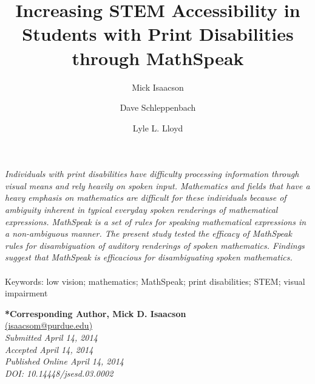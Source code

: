 \documentclass[11.5pt]{sig-alternate} %
\makeatletter
\let\oldabstract\abstract
\let\oldendabstract\endabstract
\renewenvironment{abstract} %
{\renewenvironment{quotation}%
               {\list{}{\addtolength{\leftmargin}{1em} %
                        \listparindent 1.5em%
                        \itemindent    \listparindent%
                        \rightmargin   \leftmargin%
                        \parsep        \z@ \@plus\p@}%
                \item\relax}%
               {\endlist}%
\oldabstract}
{\oldendabstract}
\makeatother
\begin{document}
\title{Increasing STEM Accessibility in Students with Print Disabilities through MathSpeak}

\author[1]{\large \color{blue} Mick Isaacson}
\author[ ]{\large \color{blue} Dave Schleppenbach}
\author[1]{\large \color{blue} Lyle L. Lloyd}


\toappear{}

\maketitle
\begin{@twocolumnfalse} 
\begin{abstract}
\item 
\begin{large}
\textit{Individuals with print disabilities have difficulty processing information through visual means and rely heavily on spoken input. Mathematics and fields that have a heavy emphasis on mathematics are difficult for these individuals because of ambiguity inherent in typical everyday spoken renderings of mathematical expressions. MathSpeak is a set of rules for speaking mathematical expressions in a non-ambiguous manner. The present study tested the efficacy of MathSpeak rules for disambiguation of auditory renderings of spoken mathematics. Findings suggest that MathSpeak is efficacious for disambiguating spoken mathematics.} \\ \\
 
Keywords: low vision; mathematics; MathSpeak; print disabilities; STEM; visual impairment

\end{large} 
\end{abstract}
\end{@twocolumnfalse}



\textbf{*Corresponding Author, Mick D. Isaacson}\\
\href{mailto:isaacsom@purdue.edu}{(isaacsom@purdue.edu)}\\
\textit{Submitted April 14, 2014}\\
\textit{Accepted April 14, 2014}\\
\textit{Published Online April 14, 2014}\\
\textit{DOI: 10.14448/jsesd.03.0002}\\

\pagebreak
\clearpage
\end{document}
